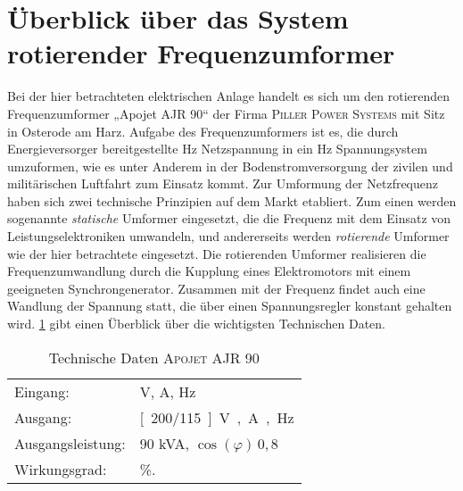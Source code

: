 \section{Überblick über das System rotierender Frequenzumformer}
\label{sec:Uberblick}
Bei der hier betrachteten elektrischen Anlage handelt es sich um den rotierenden Frequenzumformer „Apojet AJR 90“ der Firma \textsc{Piller Power Systems} mit Sitz in Osterode am Harz. Aufgabe des Frequenzumformers ist es, die durch Energieversorger bereitgestellte \unit[50]{Hz} Netzspannung in ein \unit[400]{Hz} Spannungsystem umzuformen, wie es unter Anderem in der Bodenstromversorgung der zivilen und militärischen Luftfahrt zum Einsatz kommt.
Zur Umformung der Netzfrequenz haben sich zwei technische Prinzipien auf dem Markt etabliert. Zum einen werden sogenannte \emph{statische} Umformer eingesetzt, die die Frequenz mit dem Einsatz von Leistungselektroniken umwandeln, und andererseits werden \emph{rotierende} Umformer wie der hier betrachtete eingesetzt. Die rotierenden Umformer realisieren die Frequenzumwandlung durch die Kupplung eines Elektromotors mit einem geeigneten Synchrongenerator. Zusammen mit der Frequenz findet auch eine Wandlung der Spannung statt, die über einen Spannungsregler konstant gehalten wird. \cref{tab:Leistungsdaten} gibt einen Überblick über die wichtigsten Technischen Daten.
\begin{table}
\caption{Technische Daten \textsc{Apojet AJR 90}}\label{tab:Leistungsdaten}
\centering
\begin{tabular}{@{}ll@{}}
\toprule
Eingang:         & \unit[400]{V}, \unit[145]{A}, \unit[50]{Hz}      \\ 
Ausgang:         & \unit[200/115]{V}, \unit[260]{A}, \unit[400]{Hz} \\
Ausgangsleistung:& 90 kVA, $\cos(\varphi)\, 0,8$                    \\
Wirkungsgrad:    & \unit[85]{\%}.                                   \\ \bottomrule
\end{tabular}
\end{table}

